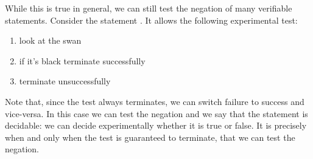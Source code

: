	While this is true in general, we can still test the negation of many verifiable statements. Consider the statement . It allows the following experimental test:
	\begin{enumerate}
		\item look at the swan
		\item if it's black terminate successfully
		\item terminate unsuccessfully
	\end{enumerate}
	Note that, since the test always terminates, we can switch failure to success and vice-versa. In this case we can test the negation and we say that the statement is decidable: we can decide experimentally whether it is true or false. It is precisely when and only when the test is guaranteed to terminate, that we can test the negation.
	
